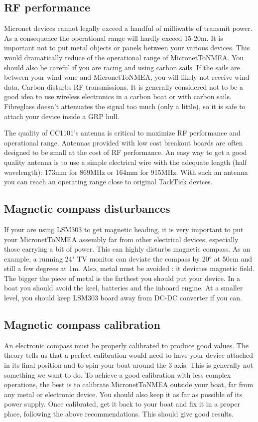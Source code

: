 \documentclass{report}
\begin{document}
\subsection{RF performance}
Micronet devices cannot legally exceed a handful of milliwatts of transmit power. As a consequence the operational range will hardly exceed 15-20m. It is important not to put metal objects or panels between your various devices. This would dramatically reduce of the operational range of MicronetToNMEA.
You should also be careful if you are racing and using carbon sails. If the sails are between your wind vane and MicronetToNMEA, you will likely not receive wind data. Carbon disturbs RF transmissions.
It is generally considered not to be a good idea to use wireless electronics in a carbon boat or with carbon sails. Fibreglass doesn't attenuates the signal too much (only a little), so it is safe to attach your device inside a GRP hull.

The quality of CC1101's antenna is critical to maximize RF performance and operational range. Antennas provided with low cost breakout boards are often designed to be small at the cost of RF performance. An easy way to get a good quality antenna is to use a simple electrical wire with the adequate length (half wavelength): 173mm for 869MHz or 164mm for 915MHz. With such an antenna you can reach an operating range close to original TackTick devices.

\subsection{Magnetic compass disturbances}
\label{compass-recommendations}
If your are using LSM303 to get magnetic heading, it is very important to put your MicronetToNMEA assembly far from other electrical devices, especially those carrying a bit of power. This can highly disturbs magnetic compass. As an example, a running 24" TV monitor can deviate the compass by 20° at 50cm and still a few degrees at 1m.
Also, metal must be avoided : it deviates magnetic field. The bigger the piece of metal is the farthest you should put your device. In a boat you should avoid the keel, batteries and the inboard engine. At a smaller level, you should keep LSM303 board away from DC-DC converter if you can.

\subsection{Magnetic compass calibration}
An electronic compass must be properly calibrated to produce good values. The theory tells us that a perfect calibration would need to have your device attached in its final position and to spin your boat around the 3 axis. This is generally not something we want to do. To achieve a good calibration with less complex operations, the best is to calibrate MicronetToNMEA outside your boat, far from any metal or electronic device. You should also keep it as far as possible of its power supply. Once calibrated, get it back to your boat and fix it in a proper place, following the above recommendations. This should give good results.
\end{document}
